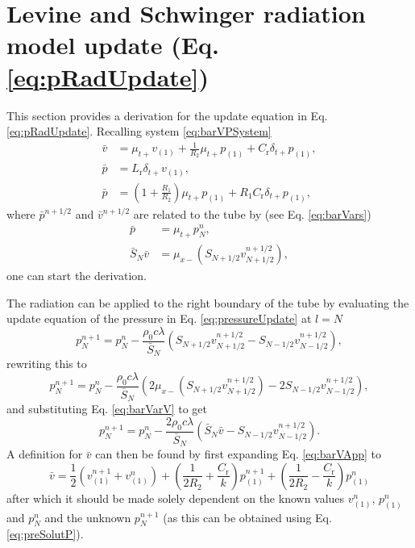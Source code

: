 \section{Levine and Schwinger radiation model update (Eq. \eqref{eq:pRadUpdate})}\label{app:levineSchwingDeriv}
\def\r{\text{r}}
\def\one{{(1)}}
This section provides a derivation for the update equation in Eq. \eqref{eq:pRadUpdate}. Recalling system \eqref{eq:barVPSystem}
\begin{subequations}\label{eq:barVPSystemApp}
    \begin{align}
        \bar v &= \mu_{t+}v_\one + \frac{1}{R_2}\mu_{t+}p_\one + C_\r \delta_{t+}p_\one,\label{eq:barVApp}\\
        \bar p &= L_\r \delta_{t+}v_\one,\label{eq:barP1App}\\
        \bar p &= \left(1+\frac{R_1}{R_2}\right)\mu_{t+}p_\one+ R_1 C_\r\delta_{t+}p_\one\label{eq:barP2App},
    \end{align}
\end{subequations}
where $\bar p^{n+1/2}$ and $\bar v^{n+1/2}$ are related to the tube by (see Eq. \eqref{eq:barVars})
\begin{align}
    \bar p &= \mu_{t+}p^n_N,\label{eq:barVarP}\\
    \bar S_N \bar v &= \mu_{x-}\left(S_{N+1/2}v_{N+1/2}^{n+1/2}\right),\label{eq:barVarV}
\end{align}
one can start the derivation. 

The radiation can be applied to the right boundary of the tube by evaluating the update equation of the pressure in Eq. \eqref{eq:pressureUpdate} at $l = N$
\begin{equation}
    p_N^{n+1} = p_N^n - \frac{\rho_0 c \lambda}{\bar{S}_N}\left(S_{N+1/2}v_{N+1/2}^{n+1/2}-S_{N-1/2}v_{N-1/2}^{n+1/2}\right),
\end{equation}
rewriting this to 
\begin{equation*}
    p_N^{n+1} = p_N^n - \frac{\rho_0 c \lambda}{\bar{S}_N}\left(2\mu_{x-}\left(S_{N+1/2}v_{N+1/2}^{n+1/2}\right)-2S_{N-1/2}v_{N-1/2}^{n+1/2}\right),
\end{equation*}
and substituting Eq. \eqref{eq:barVarV} to get
\begin{equation}
    p_N^{n+1} = p_N^n - \frac{2\rho_0 c \lambda}{\bar{S}_N}\left(\bar S_N \bar v-S_{N-1/2}v_{N-1/2}^{n+1/2}\right)\label{eq:preSolutP}.
\end{equation}
A definition for $\bar v$ can then be found by first expanding Eq. \eqref{eq:barVApp} to 
\begin{equation}\label{eq:vBarExpanded}
    \bar v = \frac{1}{2}\left(v_\one^{n+1} + v_\one^n\right) + \left(\frac{1}{2R_2} + \frac{C_\r}{k}\right) p_\one^{n+1} +\left(\frac{1}{2R_2} - \frac{C_\r}{k}\right)p_\one^n
\end{equation}
after which it should be made solely dependent on the known values $v_\one^n$, $p_\one^n$ and $p_N^n$ and the unknown $p_N^{n+1}$ (as this can be obtained using Eq. \eqref{eq:preSolutP}).

